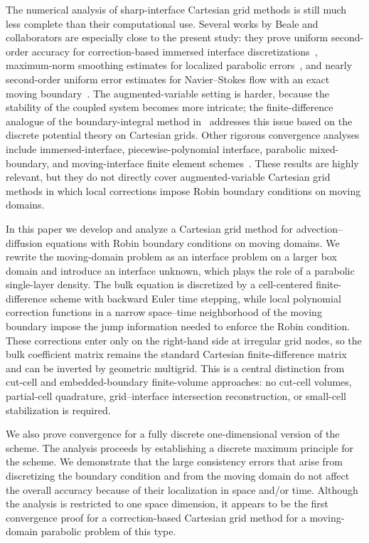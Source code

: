 \documentclass[11pt,reqno]{amsart}
\theoremstyle{plain}
\theoremstyle{definition}
\numberwithin{equation}{section}
\begin{document}
The numerical analysis of sharp-interface Cartesian grid methods is still much less complete than their computational use. Several works by Beale and collaborators are especially close to the present study: they prove uniform second-order accuracy for correction-based immersed interface discretizations~\cite{BealeLayton2006}, maximum-norm smoothing estimates for localized parabolic errors~\cite{Beale2009Smoothing}, and nearly second-order uniform error estimates for Navier--Stokes flow with an exact moving boundary~\cite{Beale2015NS}. The augmented-variable setting is harder, because the stability of the coupled system becomes more intricate; the finite-difference analogue of the boundary-integral method in~\cite{BealeYing2019} addresses this issue based on the discrete potential theory on Cartesian grids. Other rigorous convergence analyses include immersed-interface, piecewise-polynomial interface, parabolic mixed-boundary, and moving-interface finite element schemes~\cite{HuangLi1999,ChenStrain2008,BouchonPeichl2010Mixed,Guo2021}. These results are highly relevant, but they do not directly cover augmented-variable Cartesian grid methods in which local corrections impose Robin boundary conditions on moving domains. 

In this paper we develop and analyze a Cartesian grid method for advection--diffusion equations with Robin boundary conditions on moving domains. We rewrite the moving-domain problem as an interface problem on a larger box domain and introduce an interface unknown, which plays the role of a parabolic single-layer density. The bulk equation is discretized by a cell-centered finite-difference scheme with backward Euler time stepping, while local polynomial correction functions in a narrow space--time neighborhood of the moving boundary impose the jump information needed to enforce the Robin condition. These corrections enter only on the right-hand side at irregular grid nodes, so the bulk coefficient matrix remains the standard Cartesian finite-difference matrix and can be inverted by geometric multigrid. This is a central distinction from cut-cell and embedded-boundary finite-volume approaches: no cut-cell volumes, partial-cell quadrature, grid--interface intersection reconstruction, or small-cell stabilization is required. 

We also prove convergence for a fully discrete one-dimensional version of the scheme. The analysis proceeds by establishing a discrete maximum principle for the scheme. We demonstrate that the large consistency errors that arise from discretizing the boundary condition and from the moving domain do not affect the overall accuracy because of their localization in space and/or time. Although the analysis is restricted to one space dimension, it appears to be the first convergence proof for a correction-based Cartesian grid method for a moving-domain parabolic problem of this type.
\end{document}
